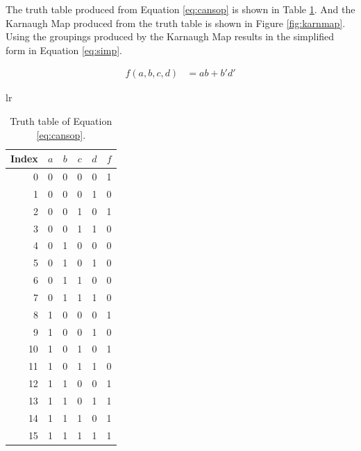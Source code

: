 \documentclass[12pt]{article}
\begin{document}
The truth table produced from Equation \ref{eq:cansop}
is shown in Table \ref{tab:tt}.
And the Karnaugh Map produced from the truth table
is shown in Figure \ref{fig:karnmap}.
Using the groupings produced by the Karnaugh Map
results in the simplified form in Equation \ref{eq:simp}.

\begin{align}
f(a, b, c, d) &= ab + b'd' \label{eq:simp}
\end{align}

\begin{table}[!hbt]
\begin{center}

\begin{tabular}{lr}
  \begin{tabular}[t]{r|cccc|c}
Index&$a$&$b$&$c$&$d$&$f$\\
\hline
0  &0&0&0&0 &1\\
1  &0&0&0&1 &0\\
2  &0&0&1&0 &1\\
3  &0&0&1&1 &0\\
4  &0&1&0&0 &0\\
5  &0&1&0&1 &0\\
6  &0&1&1&0 &0\\
7  &0&1&1&1 &0\\
8  &1&0&0&0 &1\\
9  &1&0&0&1 &0\\
10 &1&0&1&0 &1\\
11 &1&0&1&1 &0\\
12 &1&1&0&0 &1\\
13 &1&1&0&1 &1\\
14 &1&1&1&0 &1\\
15 &1&1&1&1 &1\\

  \end{tabular}
\end{tabular}
\end{center}

\caption{Truth table of Equation \ref{eq:cansop}.}
\label{tab:tt}
\end{table}
\end{document}
